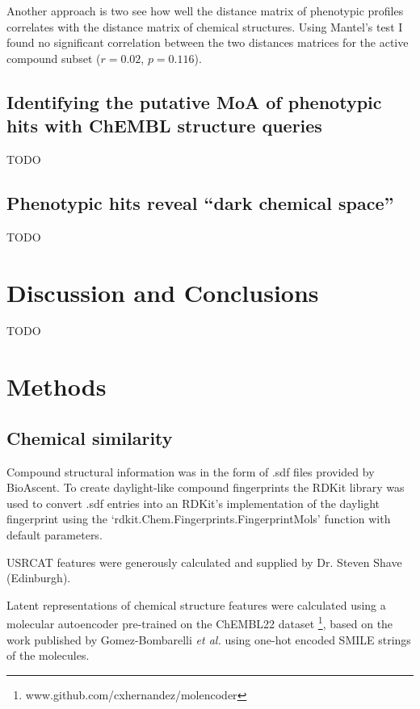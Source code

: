 \documentclass[a4paper,11pt,twoside,openright]{scrbook}
\begin{document}
Another approach is two see how well the distance matrix of phenotypic profiles correlates with the distance matrix of chemical structures.
Using Mantel's test\cite{Mantel1967} I found no significant correlation between the two distances matrices for the active compound subset ($r = 0.02$, $p = 0.116$).



\subsection{Identifying the putative MoA of phenotypic hits with ChEMBL structure queries}
TODO

\subsection{Phenotypic hits reveal ``dark chemical space''}
TODO

\section{Discussion and Conclusions}
TODO


\section{Methods}

\subsection{Chemical similarity}
Compound structural information was in the form of .sdf files provided by BioAscent.
To create daylight-like compound fingerprints the RDKit library was used to convert .sdf entries into an RDKit's implementation of the daylight fingerprint using the `rdkit.Chem.Fingerprints.FingerprintMols' function with default parameters.

USRCAT features were generously calculated and supplied by Dr. Steven Shave (Edinburgh).

Latent representations of chemical structure features were calculated using a molecular autoencoder pre-trained on the ChEMBL22 dataset \footnote{www.github.com/cxhernandez/molencoder}, based on the work published by Gomez-Bombarelli \textit{et al.} \cite{Gomez-Bombarelli2016} using one-hot encoded SMILE strings of the molecules.
\end{document}
